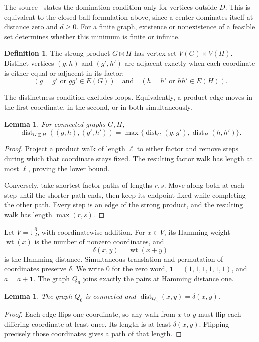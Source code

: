 \documentclass[11pt]{article}
\newtheorem{lemma}[theorem]{Lemma}
\theoremstyle{definition}
\newtheorem{definition}[theorem]{Definition}
\theoremstyle{remark}
\newcommand{\F}{\mathbb F}
\newcommand{\wt}{\operatorname{wt}}
\newcommand{\dist}{\operatorname{dist}}
\begin{document}
The source~\cite{bickz-strong} states the domination condition only for
vertices outside \(D\). This is equivalent to the closed-ball formulation
above, since a center dominates itself at distance zero and \(d\ge0\).
For a finite graph, existence or nonexistence of a feasible set
determines whether this minimum is finite or infinite.

\begin{definition}
The strong product \(G\boxtimes H\) has vertex set \(V(G)\times V(H)\).
Distinct vertices \((g,h)\) and \((g',h')\) are adjacent exactly when
each coordinate is either equal or adjacent in its factor:
\[
 (g=g'\text{ or }gg'\in E(G))
 \quad\text{and}\quad
 (h=h'\text{ or }hh'\in E(H)).
\]
\end{definition}
The distinctness condition excludes loops. Equivalently, a product
edge moves in the first coordinate, in the second, or in both
simultaneously.

\begin{lemma}\label{lem:product-distance}
For connected graphs \(G,H\),
\[
 \dist_{G\boxtimes H}((g,h),(g',h'))
   =\max\{\dist_G(g,g'),\dist_H(h,h')\}.
\]
\end{lemma}
\begin{proof}
Project a product walk of length \(\ell\) to either factor and remove
steps during which that coordinate stays fixed. The resulting factor
walk has length at most \(\ell\), proving the lower bound.

Conversely, take shortest factor paths of lengths \(r,s\).
Move along both at each step until the shorter path ends, then keep
its endpoint fixed while completing the other path. Every step is
an edge of the strong product, and the resulting walk has length
\(\max(r,s)\).
\end{proof}

Let \(V=\F_2^6\), with coordinatewise addition. For \(x\in V\), its
Hamming weight \(\wt(x)\) is the number of nonzero coordinates, and
\[
 \delta(x,y)=\wt(x+y)
\]
is the Hamming distance. Simultaneous translation and permutation of
coordinates preserve \(\delta\). We write \(0\) for the zero word,
\(\mathbf1=(1,1,1,1,1,1)\), and \(\bar a=a+\mathbf1\).
The graph \(Q_6\) joins exactly the pairs at Hamming distance one.

\begin{lemma}\label{lem:cube-distance}
The graph \(Q_6\) is connected and
\(\dist_{Q_6}(x,y)=\delta(x,y)\).
\end{lemma}
\begin{proof}
Each edge flips one coordinate, so any walk from \(x\) to \(y\) must
flip each differing coordinate at least once. Its length is at least
\(\delta(x,y)\). Flipping precisely those coordinates gives a path
of that length.
\end{proof}
\end{document}
